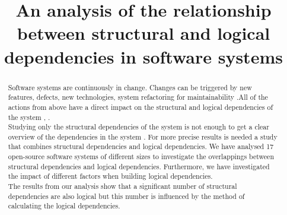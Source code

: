 \documentclass[conference,compsoc]{IEEEtran}
\begin{document}
\title{An analysis of the relationship between structural and logical\\ dependencies in software systems 
}


\author{
\and
{}
}

\maketitle

\begin{abstract}
Software systems are continuously in change. Changes can be triggered by new features, defects, new technologies, system refactoring for maintainability \cite{ct1}.All of the actions from above have a direct impact on the structural and logical dependencies of the system \cite{ct8}, \cite{ct6}.\\Studying only the structural dependencies of the system is not enough to get a clear overview of the dependencies in the system . For more precise results is needed a study that combines structural dependencies and logical dependencies. We have analysed 17 open-source software systems of different sizes to investigate the overlappings between structural dependencies and logical dependencies. Furthermore, we have investigated the impact of different factors when building logical dependencies.\\The results from our analysis show that a significant number of structural dependencies are also logical but this number is influenced by the method of calculating the logical dependencies.

\end{abstract}

\IEEEpeerreviewmaketitle
\end{document}
